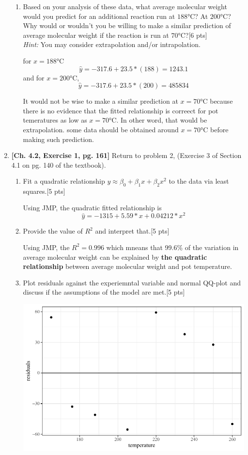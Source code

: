 \documentclass[11pt]{article}\usepackage[]{graphicx}\usepackage[]{color}
\begin{document}
\begin{enumerate}
\begin{enumerate}
    \item Based on your analysis of these data, what average molecular weight would you predict for an additional reaction run at $188$°C? At $200$°C? Why would or wouldn't you be willing to make a similar prediction of average molecular weight if the reaction is run at $70$°C?[6 pts]\\
    \emph{Hint:} You may consider extrapolation and/or intrapolation.
	
	for $x= 188$°C 
	$$\hat{y}= -317.6 +23.5 * (188)= 1243.1 $$
	and for $x= 200$°C, 
	$$\hat{y}= -317.6 +23.5 * (200)= 485834$$
	
	It would not be wise to make a similar prediction at $x=70$°C because there is no evidence that the fitted relationship is correect for pot temeratures as low as $x=70$°C. In other word, that would be extrapolation. some data should be obtained around $x=70$°C before making such prediction. 
	\end{enumerate}

	
	\item  \textbf{[Ch. 4.2, Exercise 1, pg. 161]} Return to problem 2, (Exercise 3 of Section 4.1 on pg. 140 of the textbook). 
	\begin{enumerate}
	
	  \item Fit a quadratic relationship $y \approx \beta_0 + \beta_1 x + \beta_2 x^2$ to the data via least squares.[5 pts] 
	  

	  Using JMP, the quadratic fitted relationship is
	  $$\hat{y}= -1315 + 5.59*x +0.04212*x^2 $$
	  \item Provide the value of $R^2$ and interpret that.[5 pts]
	  
	  Using JMP, the $R^2 = 0.996$ which mneans that 99.6\% of the variation in average molecular weight can be explained by \textbf{the quadratic relationship} between average molecular weight and pot temperature. 
	  
	  \item Plot residuals against the experiemntal variable and normal QQ-plot and discuss if the assumptions of the model are met.[5 pts]
	  
	  
\includegraphics{stat305-hw4_sol-009}



\end{enumerate}
\end{enumerate}
\end{document}

